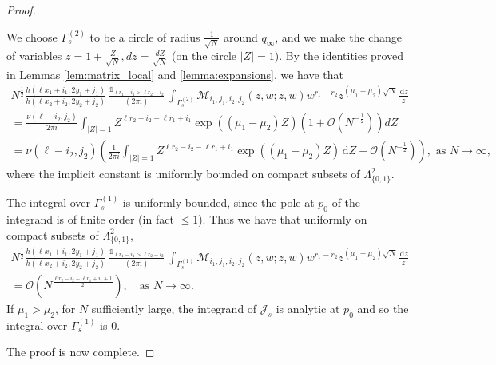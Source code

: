 \documentclass[10pt,a4paper]{amsart}
\renewcommand{\d}{\,\mathrm{d}}
\renewcommand{\i}{\mathrm{i}}
\DeclareMathOperator{\one}{\mathds{1}}
\begin{document}
\begin{proof}
\begin{enumerate}
%
%
 We choose  $\Gamma_s^{(2)}$ to be a circle of radius $\frac{1}{\sqrt{N}}$ around $q_{\infty}$, and we make the change of variables $z=1+\frac{Z}{\sqrt{N}}, dz=\frac{dZ}{\sqrt{N}}$ (on the circle $|Z|=1$). By the identities proved in Lemmas \ref{lem:matrix_local} and \ref{lemma:expansions}, we have that
\begin{multline}
N^{\frac{1}{2}}
\frac{h(\ell x_1+i_1,2y_1+j_1)}{h(\ell x_2+i_2,2y_2+j_2)}
\frac{\one_{\ell r_1-i_1>\ell r_2-i_2}}{(2\pi\i)}\int_{ \Gamma_s^{(2)}}
\boldsymbol{\mathcal{M}}_{i_1,j_1,i_2,j_2}(z,w;z,w) 
w^{r_1-r_2}
z^{(\mu_1-\mu_2)\sqrt{N}}
\frac{\d z}{z}
%
%
\\=
%
\frac{\nu(\ell-i_2,j_2)}{2\pi i}
%
\int_{|Z|=1} Z^{\ell r_2-i_2-\ell r_1+i_1}
\exp((\mu_1-\mu_2) Z)
 \left(1+\mathcal{O}(N^{-\frac{1}{2}})\right)dZ
\\= \nu(\ell-i_2,j_2)
%
\left(
 \frac{1}{2\pi i}\int_{|Z|=1} 
  Z^{\ell r_2-i_2-\ell r_1+i_1}
\exp((\mu_1-\mu_2) Z)
\d Z
+\mathcal{O}\left(N^{-\frac{1}{2}}\right)\right),
\text{  as  }
 N\rightarrow\infty,
  \end{multline}
where the implicit constant is uniformly bounded on compact subsets of $\Lambda_{\{0,1\}}^2$.


The integral over $\Gamma_s^{(1)}$ is uniformly bounded, since the pole at $p_0$ of the integrand is of finite order (in fact $\leq 1$). Thus we have that uniformly on compact subsets of $\Lambda_{\{0,1\}}^2$,
\begin{multline}\label{eqn:justify_last_line}
N^{\frac{1}{2}}
\frac{h(\ell x_1+i_1,2y_1+j_1)}{h(\ell x_2+i_2,2y_2+j_2)}
\frac{\one_{\ell r_1-i_1>\ell r_2-i_2}}{(2\pi\i)}\int_{ \Gamma_s^{(1)}}
\boldsymbol{\mathcal{M}}_{i_1,j_1,i_2,j_2}(z,w;z,w) 
w^{r_1-r_2}
z^{(\mu_1-\mu_2)\sqrt{N}}
\frac{\d z}{z}
\\=\mathcal{O}\left(N^{\frac{\ell r_2-i_2-\ell r_1+i_1+1}{2}}\right),\quad\text{as } N\rightarrow\infty.
\end{multline}
%
%
If $\mu_1>\mu_2$, for $N$ sufficiently large, the integrand of $\mathcal{J}_s$ is analytic at $p_0$ and so the integral over $\Gamma_s^{(1)}$ is 0.
\end{enumerate}
The proof is now complete.
% 
\end{proof}
\end{document}
